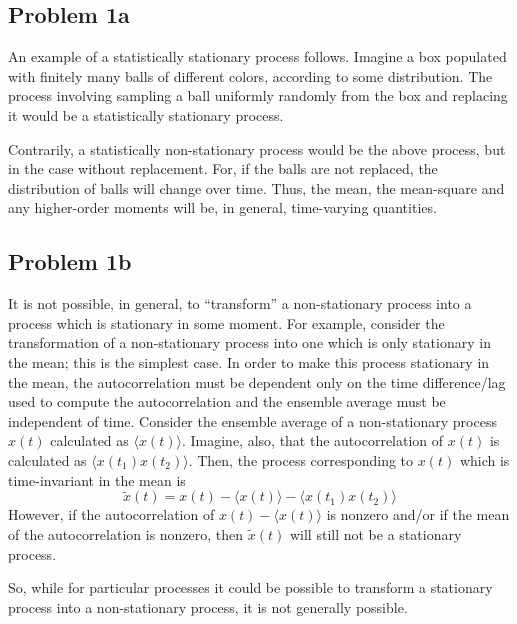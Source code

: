 \begin{homeworkProblem}
   \subsection{Problem 1a}
   An example of a statistically stationary process follows. Imagine a box
   populated with finitely many balls of different colors, according to some
   distribution. The process involving sampling a ball uniformly randomly from
   the box and replacing it would be a statistically stationary process.

   Contrarily, a statistically non-stationary process would be the above
   process, but in the case without replacement. For, if the balls are not
   replaced, the distribution of balls will change over time. Thus, the mean,
   the mean-square and any higher-order moments will be, in general,
   time-varying quantities.

   \subsection{Problem 1b} It is not possible, in general, to ``transform'' a
   non-stationary process into a process which is stationary in some moment. For
   example, consider the transformation of a non-stationary process into one
   which is only stationary in the mean; this is the simplest case. In
   order to make this process stationary in the mean, the autocorrelation must
   be dependent only on the time difference/lag used to compute the
   autocorrelation and the ensemble average must be independent of time. Consider
   the ensemble average of a non-stationary process $ x(t) $ calculated as $
   \langle x(t) \rangle  $. Imagine, also, that the autocorrelation of $ x(t) $ is
   calculated as $ \langle x(t_1) x(t_2) \rangle  $. Then, the process corresponding to $ x(t) $ which is
   time-invariant in the mean is
   \[
      \tilde{x}(t) = x(t) - \langle x(t) \rangle -
      \langle x(t_1) x(t_2) \rangle
   \]
   However, if the autocorrelation of $ x(t) -
   \langle x(t) \rangle $ is nonzero and/or if the mean of the autocorrelation
   is nonzero, then $ \tilde{x}(t) $ will still not be a stationary process.

   So, while for particular processes it could be possible to transform a
   stationary process into a non-stationary process, it is not generally
   possible.


\end{homeworkProblem}
